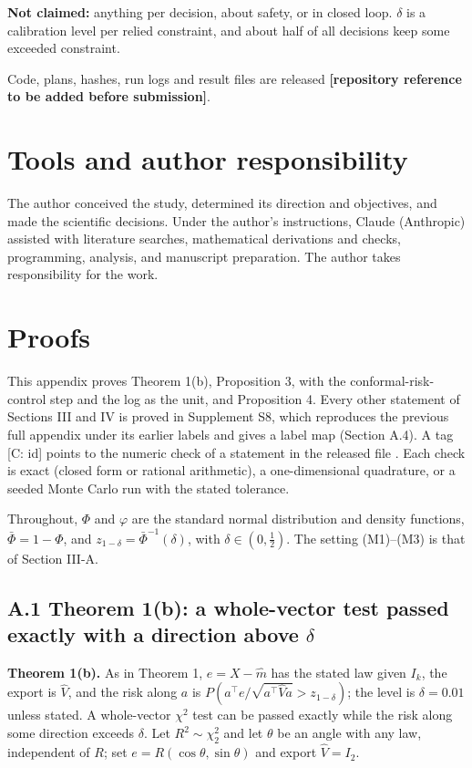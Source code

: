 \documentclass{ieeeaccess}
\begin{document}
\textbf{Not claimed:} anything per decision, about safety, or in closed loop. $\delta$ is a calibration level per relied constraint, and about half of all decisions keep some exceeded constraint.

Code, plans, hashes, run logs and result files are released \textbf{[repository reference to be added before submission]}.

\section*{Tools and author responsibility}
The author conceived the study, determined its direction and objectives, and made the scientific decisions. Under the author's instructions, Claude (Anthropic) assisted with literature searches, mathematical derivations and checks, programming, analysis, and manuscript preparation. The author takes responsibility for the work.

\appendices
\section{\break Proofs}
This appendix proves Theorem 1(b), Proposition 3, with the conformal-risk-control step and the log as the unit, and Proposition 4. Every other statement of Sections III and IV is proved in Supplement S8, which reproduces the previous full appendix under its earlier labels and gives a label map (Section A.4). A tag [C: id] points to the numeric check of a statement in the released file . Each check is exact (closed form or rational arithmetic), a one-dimensional quadrature, or a seeded Monte Carlo run with the stated tolerance.

Throughout, $\Phi$ and $\varphi$ are the standard normal distribution and density functions, $\bar{\Phi} = 1 - \Phi$, and $z_{1-\delta} = \bar{\Phi}^{-1}(\delta)$, with $\delta \in (0, \tfrac{1}{2})$. The setting (M1)--(M3) is that of Section III-A.

\subsection*{A.1 Theorem 1(b): a whole-vector test passed exactly with a direction above $\delta$}
\textbf{Theorem 1(b).} As in Theorem 1, $e = X - \hat{m}$ has the stated law given $I_{k}$, the export is $\hat{V}$, and the risk along $a$ is $P(a^{\top}e/\sqrt{a^{\top}\hat{V}a} > z_{1-\delta})$; the level is $\delta = 0.01$ unless stated. A whole-vector $\chi^{2}$ test can be passed exactly while the risk along some direction exceeds $\delta$. Let $R^{2} \sim \chi_{2}^{2}$ and let $\theta$ be an angle with any law, independent of $R$; set $e = R(\cos \theta, \sin \theta)$ and export $\hat{V} = I_{2}$.
\end{document}
